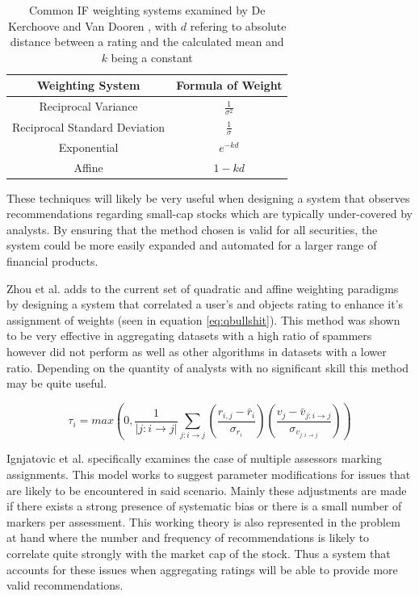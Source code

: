 \begin{table}[H]
    \centering
    \begin{tabular}{c c}
    \toprule\toprule
    Weighting System & Formula of Weight \\ \midrule
    Reciprocal Variance & $\frac{1}{\sigma^2}$ \\
    \addlinespace
    Reciprocal Standard Deviation & $\frac{1}{\sigma}$\\
    \addlinespace
    Exponential & $e^{-kd}$ \\
    \addlinespace
    Affine & $1-kd$ \\ \bottomrule
    \end{tabular}
    \caption[Common IF weighting systems]{Common IF weighting systems examined by De Kerchoove and Van Dooren \cite{de2010iterative}, with $d$ refering to absolute distance between a rating and the calculated mean and $k$ being a constant}
    \label{tab:deKerchWeight}
\end{table}

These techniques will likely be very useful when designing a system that observes recommendations regarding small-cap stocks which are typically under-covered by analysts. By ensuring that the method chosen is valid for all securities, the system could be more easily expanded and automated for a larger range of financial products.

Zhou et al. \cite{zhou2011robust} adds to the current set of quadratic and affine weighting paradigms by designing a system that correlated a user's and objects rating to enhance it's assignment of weights (seen in equation \ref{eq:qbullshit}). This method was shown to be very effective in aggregating datasets with a high ratio of spammers however did not perform as well as other algorithms in datasets with a lower ratio. Depending on the quantity of analysts with no significant skill this method may be quite useful.


\begin{equation}
    \tau_i = max\left(0, 
    \frac{1}{|j:i\rightarrow j|}
    \sum\limits_{j:i\rightarrow j}
    \left(\frac{r_{i,j} - \bar{r}_i}{\sigma_{r_i}}\right)
    \left(\frac{v_{j} - \bar{v}_{j:i\rightarrow j}}{\sigma_{v_{j:i\rightarrow j}}}\right)
    \right) \label{eq:qbullshit}
\end{equation}

Ignjatovic et al. \cite{ignjatovic2009computing} specifically examines the case of multiple assessors marking assignments. This model works to suggest parameter modifications for issues that are likely to be encountered in said scenario. Mainly these adjustments are made if there exists a strong presence of systematic bias or there is a small number of markers per assessment. This working theory is also represented in the problem at hand where the number and frequency of recommendations is likely to correlate quite strongly with the market cap of the stock. Thus a system that accounts for these issues when aggregating ratings will be able to provide more valid recommendations.

